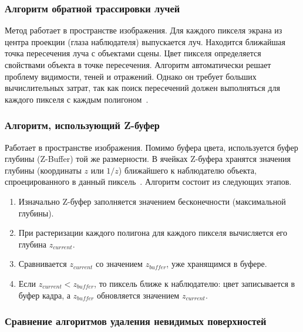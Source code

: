 \subsubsection{Алгоритм обратной трассировки лучей}
Метод работает в пространстве изображения. Для каждого пикселя экрана из центра проекции (глаза наблюдателя) выпускается луч. Находится ближайшая точка пересечения луча с объектами сцены. Цвет пикселя определяется свойствами объекта в точке пересечения.
Алгоритм автоматически решает проблему видимости, теней и отражений. Однако он требует больших вычислительных затрат, так как поиск пересечений должен выполняться для каждого пикселя с каждым полигоном~\cite{shikin2005}.

\subsubsection{Алгоритм, использующий Z-буфер}
Работает в пространстве изображения. Помимо буфера цвета, используется буфер глубины (Z-Buffer) той же размерности. В ячейках Z-буфера хранятся значения глубины (координаты $z$ или $1/z$) ближайшего к наблюдателю объекта, спроецированного в данный пиксель~\cite{rtr4}.
Алгоритм состоит из следующих этапов.
\begin{enumerate}
	\item Изначально Z-буфер заполняется значением бесконечности (максимальной глубины).
	\item При растеризации каждого полигона для каждого пикселя вычисляется его глубина $z_{current}$.
	\item Сравнивается $z_{current}$ со значением $z_{buffer}$, уже хранящимся в буфере.
	\item Если $z_{current} < z_{buffer}$, то пиксель ближе к наблюдателю: цвет записывается в буфер кадра, а $z_{buffer}$ обновляется значением $z_{current}$.
\end{enumerate}

\subsubsection{Сравнение алгоритмов удаления невидимых поверхностей}


